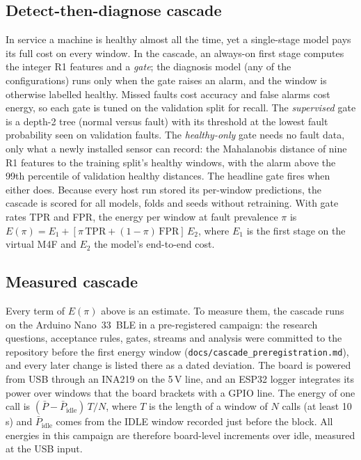 \documentclass[conference]{IEEEtran}
\begin{document}
\subsection{Detect-then-diagnose cascade}
\label{sec:casm}
In service a machine is healthy almost all the time, yet a single-stage model pays its full cost on every window. In
the cascade, an always-on first stage computes the integer R1 features and a \emph{gate}; the diagnosis model (any of
the \NumConfigs{} configurations) runs only when the gate raises an alarm, and the window is otherwise labelled
healthy. Missed faults cost accuracy and false alarms cost energy, so each gate is tuned on the validation split for
recall. The \emph{supervised} gate is a depth-2 tree (normal versus fault) with its threshold at the lowest fault
probability seen on validation faults. The \emph{healthy-only} gate needs no fault data, only what a newly installed
sensor can record: the Mahalanobis distance of nine R1 features to the training split's healthy windows, with the
alarm above the 99th percentile of validation healthy distances. The headline gate fires when either does. Because
every host run stored its per-window predictions, the cascade is scored for all models, folds and seeds without
retraining. With gate rates TPR and FPR, the energy per window at fault prevalence $\pi$ is
$E(\pi) = E_1 + [\pi\,\mathrm{TPR} + (1-\pi)\,\mathrm{FPR}]\,E_2$, where $E_1$ is the first stage on the virtual
M4F and $E_2$ the model's end-to-end cost.

\subsection{Measured cascade}
\label{sec:cashwm}
Every term of $E(\pi)$ above is an estimate. To measure them, the cascade runs on the Arduino Nano~33~BLE in a
pre-registered campaign: the research questions, acceptance rules, gates, streams and analysis were committed to the
repository before the first energy window (\texttt{docs/cascade\_preregistration.md}), and every later change is
listed there as a dated deviation. The board is powered from USB through an INA219 on the 5\,V line, and an ESP32
logger integrates its power over windows that the board brackets with a GPIO line. The energy of one call is
$(\bar P - \bar P_\text{idle})\,T/N$, where $T$ is the length of a window of $N$ calls (at least 10\,s) and
$\bar P_\text{idle}$ comes from the IDLE window recorded just before the block. All energies in this campaign are
therefore board-level increments over idle, measured at the USB input.
\end{document}
